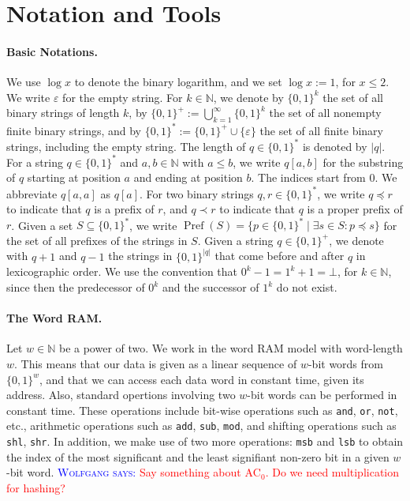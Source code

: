 \documentclass[a4paper,11pt]{article}
\newcommand{\eps}{\varepsilon}
\newcommand{\N}{\mathbb{N}}
\newcommand{\?}{\mskip1.5mu}
\DeclareMathOperator{\Pref}{Pref}
\newcommand{\aremark}[3]{\textcolor{blue}{\textsc{#1 #2:}}
  \textcolor{red}{\textsf{#3}}}
\newcommand{\wolfgang}[2][says]{\aremark{Wolfgang}{#1}{#2}}
\begin{document}
\section{Notation and Tools}
\label{sec:notation}

\paragraph{Basic Notations.}
We use $\log x$ to denote the binary logarithm, and we set 
$\log x := 1$, for $x \leq 2$.
We write $\eps$ for the empty string. For $k \in \N$, we denote by 
$\{0, 1\}^k$ the set of all binary strings of length $k$, by 
$\{0,1\}^+ := \bigcup_{k = 1}^{\infty} \{0, 1\}^k$ the set of all
nonempty finite binary strings, and by 
$\{0,1\}^* := \{0, 1\}^+ \cup \{\eps\}$ the set of all finite binary 
strings, including the empty string. 
The length of $q \in \{0, 1\}^*$ is denoted by $|q|$.
For a string $q \in \{0, 1\}^*$ and $a, b \in \N$ with $a \leq b$, 
we write $q[a, b]$ for the substring of $q$ starting at position
$a$ and ending at position $b$.  The indices start from $0$. 
We abbreviate $q[a, a]$ as $q[a]$. For two binary strings 
$q, r \in \{0,1\}^*$, we write $q \preceq r$ to indicate that $q$ is 
a prefix of $r$, and $q \prec r$ to indicate that $q$ is a proper 
prefix of $r$. 
Given a set $S \subseteq \{0, 1\}^*$, we write 
$\Pref(S) = \{p \in \{0, 1\}^* \mid \exists s \in S: p \preceq s\}$
for the set of all prefixes of the strings in $S$.
Given a string 
$q \in \{0,1\}^+$, we denote with $q + 1$ and $q - 1$ the strings in 
$\{0, 1\}^{|q|}$ that come before and after $q$ in lexicographic 
order. We use the convention that $0^k - 1 = 1^k + 1 = \bot$, for 
$k \in \N$, since then the predecessor of $0^k$ and the successor
of $1^k$ do not exist. 

\paragraph{The Word RAM.}
Let $w \in \N$ be a power of two. We work in the word RAM 
model with word-length $w$. This means that our data is given
as a linear sequence of $w$-bit words from $\{0, 1\}^w$, 
and that we can access each
data word in constant time, given its address. Also,
standard opertions involving two $w$-bit words
can be performed in constant time.
These operations include 
bit-wise operations such as \texttt{and}, \texttt{or}, 
\texttt{not}, etc., arithmetic operations
such as \texttt{add}, \texttt{sub}, \texttt{mod}, and
shifting operations such as \texttt{shl}, \texttt{shr}.
In addition, we make use of two more operations:
\texttt{msb} and \texttt{lsb} to obtain the index of the
most significant and the least signifiant non-zero bit
in a given $w$-bit word.
\wolfgang{
Say something about $\text{AC}_0$. Do we need 
multiplication for hashing?}
\end{document}
